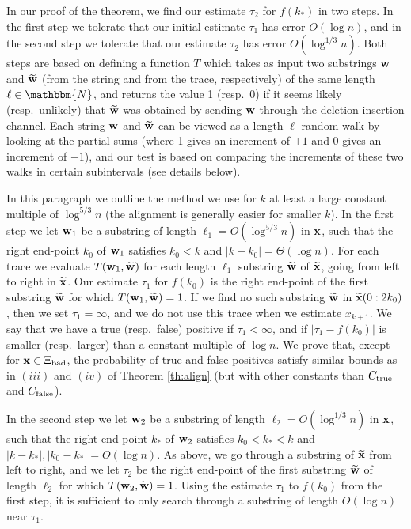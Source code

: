\documentclass[final,12pt]{colt2018} %
\newcommand{\N}{\mathbbm{N}}
\newcommand{\1}{\mathbf{1}}
\newcommand{\wt}{\widetilde}
\def\xt{{\wt {\bf x}}}
\def\x{{\bf x}}
\def\w{{\bf w}}
\def\ctrue{C_{\rm true}}
\def\cfalse{C_{\rm false}}
\def\bad{{\Xi_{\rm bad}}}
\begin{document}
In our proof of the theorem, we find our estimate $\tau_2$ for $f(k_*)$ in two steps. In the first step we tolerate that our initial estimate $\tau_1$ has error $O(\log n)$, and in the second step we tolerate that our estimate $\tau_2$ has error $O(\log^{1/3}n)$. Both steps are based on defining a function $T$ which takes as input two substrings $\w$ and $\wt\w$ (from the string and from the trace, respectively) of the same length $\ell\in\N$, and returns the value 1 (resp.\ 0) if it seems likely (resp.\ unlikely) that $\wt\w$ was obtained by sending $\w$ through the deletion-insertion channel. Each string $\w$ and $\wt\w$ can be viewed as a length $\ell$ random walk by looking at the partial sums (where 1 gives an increment of $+1$ and $0$ gives an increment of $-1$), and our test is based on comparing the increments of these two walks in certain subintervals (see details below).

In this paragraph we outline the method we use for $k$ at least a large constant multiple of $\log^{5/3} n$ (the alignment is generally easier for smaller $k$). %
In the first step we let $\w_1$ be a substring of length $\ell_1=O(\log^{5/3} n)$ in $\x$, such that the right end-point $k_0$ of $\w_1$ satisfies $k_0<k$ and $|k-k_0|=\Theta(\log n)$. For each trace we evaluate $T(\w_1,\wt\w)$ for each length $\ell_1$ substring $\wt\w$ of $\xt$, going from left to right in $\xt$. Our estimate $\tau_1$ for $f(k_0)$ is the right end-point of the first substring $\wt\w$ for which $T(\w_1,\wt\w)=1$. If we find no such substring $\wt\w$ in $\xt(0:2k_0)$, then we set $\tau_1=\infty$, and we do not use this trace when we estimate $x_{k+1}$. We say that we have a true (resp.\ false) positive if $\tau_1<\infty$, and if $|\tau_1-f(k_0)|$ is smaller (resp.\ larger) than a constant multiple of $\log n$. We prove that, except for $\x\in\bad$, the probability of true and false positives satisfy similar bounds as in $(iii)$ and $(iv)$ of Theorem \ref{th:align} (but with other constants than $\ctrue$ and $\cfalse$).

In the second step we let $\w_2$ be a substring of length $\ell_2=O(\log^{1/3} n)$ in $\x$, such that the right end-point $k_*$ of $\w_2$ satisfies $k_0<k_*<k$ and $|k-k_*|,|k_0-k_*|=O(\log n)$. As above, we go through a substring of $\xt$ from left to right, and we let $\tau_2$ be the right end-point of the first substring $\wt\w$ of length $\ell_2$ for which $T(\w_2,\wt\w)=1$. Using the estimate $\tau_1$ to $f(k_0)$ from the first step, it is sufficient to only search through a substring of length $O(\log n)$ near $\tau_1$.
\end{document}
